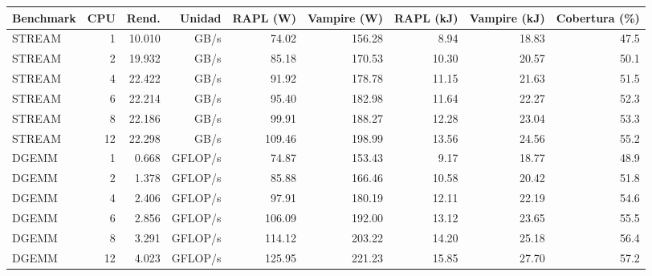 \begin{tabular}{lrrrrrrrr}
\hline
Benchmark & CPU & Rend. & Unidad & RAPL (W) & Vampire (W) & RAPL (kJ) & Vampire (kJ) & Cobertura (\%) \\
\hline
STREAM & 1 & 10.010 & GB/s & 74.02 & 156.28 & 8.94 & 18.83 & 47.5 \\
STREAM & 2 & 19.932 & GB/s & 85.18 & 170.53 & 10.30 & 20.57 & 50.1 \\
STREAM & 4 & 22.422 & GB/s & 91.92 & 178.78 & 11.15 & 21.63 & 51.5 \\
STREAM & 6 & 22.214 & GB/s & 95.40 & 182.98 & 11.64 & 22.27 & 52.3 \\
STREAM & 8 & 22.186 & GB/s & 99.91 & 188.27 & 12.28 & 23.04 & 53.3 \\
STREAM & 12 & 22.298 & GB/s & 109.46 & 198.99 & 13.56 & 24.56 & 55.2 \\
DGEMM & 1 & 0.668 & GFLOP/s & 74.87 & 153.43 & 9.17 & 18.77 & 48.9 \\
DGEMM & 2 & 1.378 & GFLOP/s & 85.88 & 166.46 & 10.58 & 20.42 & 51.8 \\
DGEMM & 4 & 2.406 & GFLOP/s & 97.91 & 180.19 & 12.11 & 22.19 & 54.6 \\
DGEMM & 6 & 2.856 & GFLOP/s & 106.09 & 192.00 & 13.12 & 23.65 & 55.5 \\
DGEMM & 8 & 3.291 & GFLOP/s & 114.12 & 203.22 & 14.20 & 25.18 & 56.4 \\
DGEMM & 12 & 4.023 & GFLOP/s & 125.95 & 221.23 & 15.85 & 27.70 & 57.2 \\
\hline
\end{tabular}

